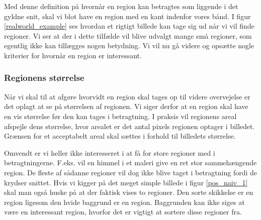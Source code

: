 {Med denne definition på hvornår en region kan betragtes som
liggende i det gyldne snit, skal vi blot have en region med en kant
indenfor vores bånd.  I figur \ref{realworld_example} ses hvordan et
rigtigt billede kan tage sig ud når vi vil finde regioner. Vi ser at der
i dette tilfælde vil blive udvalgt mange små regioner, som egentlig ikke
kan tillægges nogen betydning. Vi vil nu gå videre og opsætte nogle
kriterier for hvornår en region er interessant.

\subsubsection{Regionens størrelse}
Når vi skal til at afgøre hvorvidt en region skal tages op til videre
overvejelse er det oplagt at se på størrelsen af regionen.  Vi siger
derfor at en region skal have en vis størrelse før den kan tages i
betragtning. I praksis vil regionens areal afspejle dens størrelse, hvor
arealet er det antal pixels regionen optager i billedet. Grænsen for et
acceptabelt areal skal sættes i forhold til billedets størrelse.

Omvendt er vi heller ikke interesseret i at få for store regioner med i
betragtningerne. F.eks. vil en himmel i et maleri give en ret stor
sammehængende region. De fleste af sådanne regioner vil dog ikke blive
taget i betragtning fordi de krydser snittet. Hvis vi kigger på det
meget simple billede i figur \ref{pos_naiv_1} skal man også huske på at
der faktisk vises to regioner. Den sorte skikkelse er en region ligesom
den hvide baggrund er en region.  Baggrunden kan ikke siges at være en
interessant region, hvorfor det er vigtigt at sortere disse regioner
fra.

}
